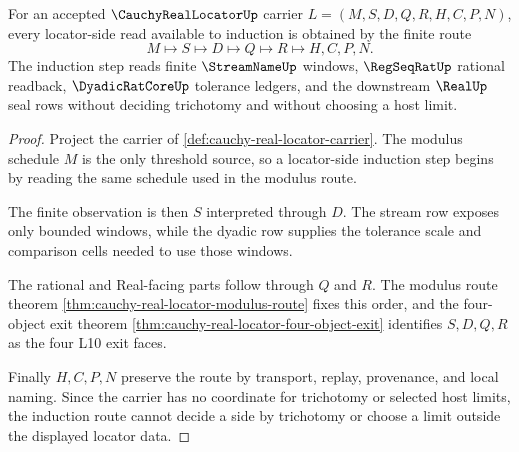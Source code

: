 \begin{theorem}
\label{thm:cauchy-real-locator-induction-route}
For an accepted $\CauchyRealLocatorUp$ carrier $L=(M,S,D,Q,R,H,C,P,N)$, every locator-side read available to induction is obtained by the finite route
$$
M \longmapsto S \longmapsto D \longmapsto Q \longmapsto R \longmapsto H,C,P,N .
$$
The induction step reads finite $\StreamNameUp$ windows, $\RegSeqRatUp$ rational readback, $\DyadicRatCoreUp$ tolerance ledgers, and the downstream $\RealUp$ seal rows without deciding trichotomy and without choosing a host limit.
\end{theorem}
\begin{proof}
Project the carrier of \autoref{def:cauchy-real-locator-carrier}. The modulus schedule $M$ is the only threshold source, so a locator-side induction step begins by reading the same schedule used in the modulus route.

The finite observation is then $S$ interpreted through $D$. The stream row exposes only bounded windows, while the dyadic row supplies the tolerance scale and comparison cells needed to use those windows.

The rational and Real-facing parts follow through $Q$ and $R$. The modulus route theorem \autoref{thm:cauchy-real-locator-modulus-route} fixes this order, and the four-object exit theorem \autoref{thm:cauchy-real-locator-four-object-exit} identifies $S,D,Q,R$ as the four L10 exit faces.

Finally $H,C,P,N$ preserve the route by transport, replay, provenance, and local naming. Since the carrier has no coordinate for trichotomy or selected host limits, the induction route cannot decide a side by trichotomy or choose a limit outside the displayed locator data.
\end{proof}


